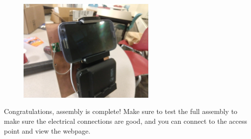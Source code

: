 \documentclass[paper=a4,parskip=full+]{scrartcl}
\begin{document}
\begin{figure}[H]
    \centering
    \includegraphics[width=0.6\textwidth]{Phone_Inserted.jpg} %
\end{figure}

Congratulations, assembly is complete! Make sure to test the full assembly to make sure the electrical connections are good, and you can connect to the access point and view the webpage.
\end{document}

